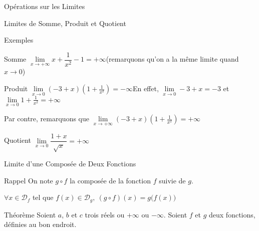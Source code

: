 \documentclass{cours}
\begin{document}
\begin{Gpartie}{Opérations sur les Limites}
\begin{Spartie}{Limites de Somme, Produit et Quotient}
            \begin{SSpartie}{Exemples} 
                \begin{SSSpartie}{Somme} 
                    $\lim\limits_{x\to+\infty}x+\dfrac{1}{x^2}-1=+\infty$\quad(remarquons qu'on a la même limite quand $x\to0$)
                \end{SSSpartie}
                \begin{SSSpartie}{Produit} 
                    $\lim\limits_{x\to0}\left(-3+x\right)\left(1+\frac{1}{x^2}\right)=-\infty$\qquad En effet, $\lim\limits_{x\to0}-3+x=-3$ et $\lim\limits_{x\to0}1+\frac{1}{x^2}=+\infty$
    
                    Par contre, remarquons que $\lim\limits_{x\to+\infty}\left(-3+x\right)\left(1+\frac{1}{x^2}\right)=+\infty$
                \end{SSSpartie}
                \begin{SSSpartie}{Quotient} 
                    $\lim\limits_{x\to0}\dfrac{1+x}{\sqrt{x}}=+\infty$
                \end{SSSpartie}
            \end{SSpartie}
        \end{Spartie}
        \pagebreak
        \begin{Spartie}{Limite d'une Composée de Deux Fonctions} 
            \begin{SSpartie}{Rappel} 
                On note $g\circ f$ la composée de la fonction $f$ suivie de $g$.

                $\forall x\in\mathcal{D}_f$ tel que $f(x)\in\mathcal{D}_g,~(g\circ f)(x)=g\big(f(x)\big)$
            \end{SSpartie}
            \begin{SSpartie}{Théorème} 
                Soient $a$, $b$ et $c$ trois réels ou $+\infty$ ou $-\infty$. Soient $f$ et $g$ deux fonctions, définies au bon endroit. 
                

\end{SSpartie}
\end{Spartie}
\end{Gpartie}
\end{document}
